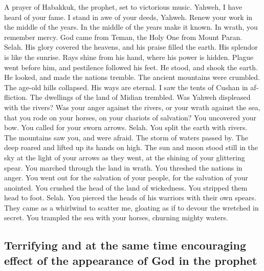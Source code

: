 \begin{paracol}{2}
\begin{otherlanguage}{english}
 A prayer of Habakkuk, the prophet, set to victorious
music.  Yahweh, I have heard of your fame. I stand in awe
of your deeds, Yahweh. Renew your work in the middle of the years. In
the middle of the years make it known. In wrath, you remember mercy.
 God came from Teman, the Holy One from Mount Paran.
Selah. His glory covered the heavens, and his praise filled the earth.
 His splendor is like the sunrise. Rays shine from his
hand, where his power is hidden.  Plague went before him,
and pestilence followed his feet.  He stood, and shook the
earth. He looked, and made the nations tremble. The ancient mountains
were crumbled. The age-old hills collapsed. His ways are eternal.
 I saw the tents of Cushan in affliction. The dwellings of
the land of Midian trembled.  Was Yahweh displeased with
the rivers? Was your anger against the rivers, or your wrath against the
sea, that you rode on your horses, on your chariots of salvation?
 You uncovered your bow. You called for your sworn arrows.
Selah. You split the earth with rivers.  The mountains
saw you, and were afraid. The storm of waters passed by. The deep roared
and lifted up its hands on high.  The sun and moon stood
still in the sky at the light of your arrows as they went, at the
shining of your glittering spear.  You marched through
the land in wrath. You threshed the nations in anger. 
You went out for the salvation of your people, for the salvation of your
anointed. You crushed the head of the land of wickedness. You stripped
them head to foot. Selah.  You pierced the heads of his
warriors with their own spears. They came as a whirlwind to scatter me,
gloating as if to devour the wretched in secret.  You
trampled the sea with your horses, churning mighty waters.

\hypertarget{terrifying-and-at-the-same-time-encouraging-effect-of-the-appearance-of-god-in-the-prophet}{%
\subsection{Terrifying and at the same time encouraging effect of the
appearance of God in the
prophet}\label{terrifying-and-at-the-same-time-encouraging-effect-of-the-appearance-of-god-in-the-prophet}}


\end{otherlanguage}
\end{paracol}
